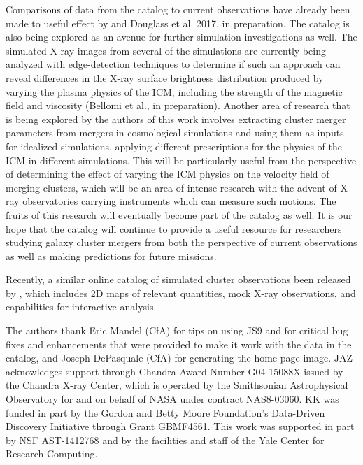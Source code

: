 \documentclass{emulateapj}
\begin{document}
Comparisons of data from the catalog to current observations have already been made to useful effect by \citet{wal17} and Douglass et al. 2017, in preparation. The catalog is also being explored as an avenue for further simulation investigations as well. The simulated X-ray images from several of the simulations are currently being analyzed with edge-detection techniques to determine if such an approach can reveal differences in the X-ray surface brightness distribution produced by varying the plasma physics of the ICM, including the strength of the magnetic field and viscosity (Bellomi et al., in preparation). Another area of research that is being explored by the authors of this work involves extracting cluster merger parameters from mergers in cosmological simulations and using them as inputs for idealized simulations, applying different prescriptions for the physics of the ICM in different simulations. This will be particularly useful from the perspective of determining the effect of varying the ICM physics on the velocity field of merging clusters, which will be an area of intense research with the advent of X-ray observatories carrying instruments which can measure such motions. The fruits of this research will eventually become part of the catalog as well. It is our hope that the catalog will continue to provide a useful resource for researchers studying galaxy cluster mergers from both the perspective of current observations as well as making predictions for future missions. 

Recently, a similar online catalog of simulated cluster observations been released by \citet{rag16}, which includes 2D maps of relevant quantities, mock X-ray observations, and capabilities for interactive analysis.

\acknowledgements
The authors thank Eric Mandel (CfA) for tips on using JS9 and for critical bug fixes and enhancements that were provided to make it work with the data in the catalog, and Joseph DePasquale (CfA) for generating the home page image. JAZ acknowledges support through Chandra Award Number G04-15088X issued by the Chandra X-ray Center, which is operated by the Smithsonian Astrophysical Observatory for and on behalf of NASA under contract NAS8-03060. KK was funded in part by the Gordon and Betty Moore Foundation's Data-Driven Discovery Initiative through Grant GBMF4561. This work was supported in part by NSF AST-1412768 and by the facilities and staff of the Yale Center for Research Computing.
\end{document}
